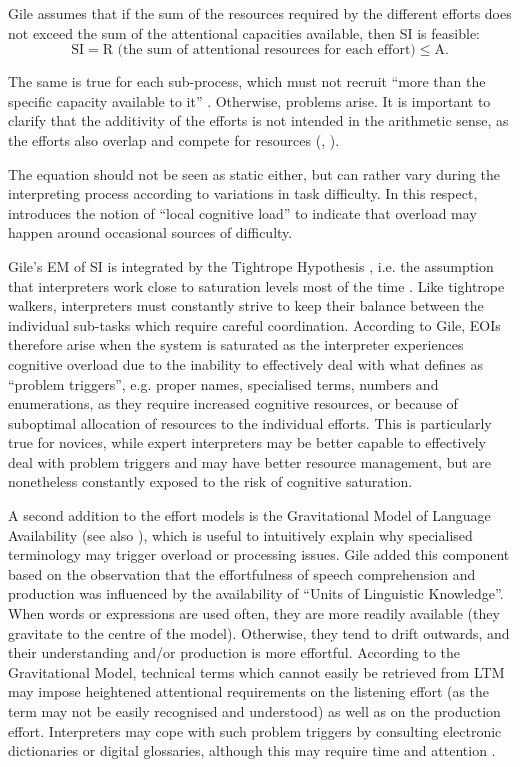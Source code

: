 Gile assumes that if the sum of the resources required by the different efforts does not exceed the sum of the attentional capacities available, then SI is feasible: 
\[\text{SI} = \text{R (the sum of attentional resources for each effort)} \leq \text{A.}\]

The same is true for each sub-process, which must not recruit ``more than the specific capacity available to it'' \citep{setton_models_2003}. Otherwise, problems arise. It is important to clarify that the additivity of the efforts is not intended in the arithmetic sense, as the efforts also overlap and compete for resources (\citealt[184]{gile_basic_2009}, \citealt[4]{gile_testing_1999}).

The equation should not be seen as static either, but can rather vary during the interpreting process according to variations in task difficulty. In this respect, \citet{gile_local_2008} introduces the notion of ``local cognitive load'' to indicate that overload may happen around occasional sources of difficulty.

Gile's EM of SI is integrated by the Tightrope Hypothesis \citep{gile_testing_1999}, i.e. the assumption that interpreters work close to saturation levels most of the time \citep[198]{gile_basic_2009}. Like tightrope walkers, interpreters must constantly strive to keep their balance between the individual sub-tasks which require careful coordination. According to Gile, EOIs therefore arise when the system is saturated as the interpreter experiences cognitive overload due to the inability to effectively deal with what \citet[157]{gile_testing_1999} defines as ``problem triggers'', e.g. proper names, specialised terms, numbers and enumerations, as they require increased cognitive resources, or because of suboptimal allocation of resources to the individual efforts. This is particularly true for novices, while expert interpreters may be better capable to effectively deal with problem triggers and may have better resource management, but are nonetheless constantly exposed to the risk of cognitive saturation.




A second addition to the effort models is the Gravitational Model of Language Availability (see also ), which is useful to intuitively explain why specialised terminology may trigger overload or processing issues. Gile added this component based on the observation that the effortfulness of speech comprehension and production was influenced by the availability of ``Units of Linguistic Knowledge''. When words or expressions are used often, they are more readily available (they gravitate to the centre of the model). Otherwise, they tend to drift outwards, and their understanding and/or production is more effortful. According to the Gravitational Model, technical terms which cannot easily be retrieved from LTM may impose heightened attentional requirements on the listening effort (as the term may not be easily recognised and understood) as well as on the production effort. Interpreters may cope with such problem triggers by consulting electronic dictionaries or digital glossaries, although this may require time and attention \citep[219]{gile_basic_2009}.

